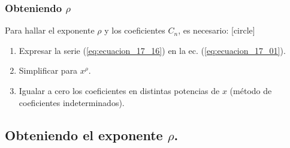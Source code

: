 \documentclass[12pt]{beamer}
\begin{document}
\begin{frame}
\frametitle{Obteniendo $\rho$}
Para hallar el exponente $\rho$ y los coeficientes $C_{n}$, es necesario:
[circle]
\begin{enumerate}[<+->]
\item Expresar la serie (\ref{eq:ecuacion_17_16}) en la ec. (\ref{eq:ecuacion_17_01}).
\item Simplificar para $x^{\rho}$.
\item Igualar a cero los coeficientes en distintas potencias de $x$ (método de coeficientes indeterminados).
\end{enumerate}
\end{frame}

\subsection{Obteniendo el exponente \texorpdfstring{$\rho$}{r}.}
\end{document}
